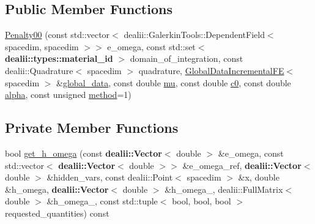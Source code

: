 \subsection*{Public Member Functions}
\begin{DoxyCompactItemize}
\item 
\hyperlink{classincremental_f_e_1_1_penalty00_ad947f9f1379a36f3d00b59957cd7f454}{Penalty00} (const std\+::vector$<$ dealii\+::\+Galerkin\+Tools\+::\+Dependent\+Field$<$ spacedim, spacedim $>$$>$ e\+\_\+omega, const std\+::set$<$ {\bf dealii\+::types\+::material\+\_\+id} $>$ domain\+\_\+of\+\_\+integration, const dealii\+::\+Quadrature$<$ spacedim $>$ quadrature, \hyperlink{classincremental_f_e_1_1_global_data_incremental_f_e}{Global\+Data\+Incremental\+FE}$<$ spacedim $>$ \&\hyperlink{classincremental_f_e_1_1_penalty00_a47da63117248061345d035043ec80b1f}{global\+\_\+data}, const double \hyperlink{classincremental_f_e_1_1_penalty00_a5b23dfd9218098c0f30884c4f1601716}{mu}, const double \hyperlink{classincremental_f_e_1_1_penalty00_a46894651008423818d058f782f2c95cd}{c0}, const double \hyperlink{classincremental_f_e_1_1_penalty00_a347920b03b04ffdd4165f10dbceef2d0}{alpha}, const unsigned \hyperlink{classincremental_f_e_1_1_penalty00_ac7ea7353834168a0cc76dbed74d4e947}{method}=1)
\end{DoxyCompactItemize}
\subsection*{Private Member Functions}
\begin{DoxyCompactItemize}
\item 
bool \hyperlink{classincremental_f_e_1_1_penalty00_a7b22e53ad262bc36a0d2e7fd1ac7eac2}{get\+\_\+h\+\_\+omega} (const {\bf dealii\+::\+Vector}$<$ double $>$ \&e\+\_\+omega, const std\+::vector$<$ {\bf dealii\+::\+Vector}$<$ double $>$$>$ \&e\+\_\+omega\+\_\+ref, {\bf dealii\+::\+Vector}$<$ double $>$ \&hidden\+\_\+vars, const dealii\+::\+Point$<$ spacedim $>$ \&x, double \&h\+\_\+omega, {\bf dealii\+::\+Vector}$<$ double $>$ \&h\+\_\+omega\+\_, dealii\+::\+Full\+Matrix$<$ double $>$ \&h\+\_\+omega\+\_, const std\+::tuple$<$ bool, bool, bool $>$ requested\+\_\+quantities) const 
\end{DoxyCompactItemize}
